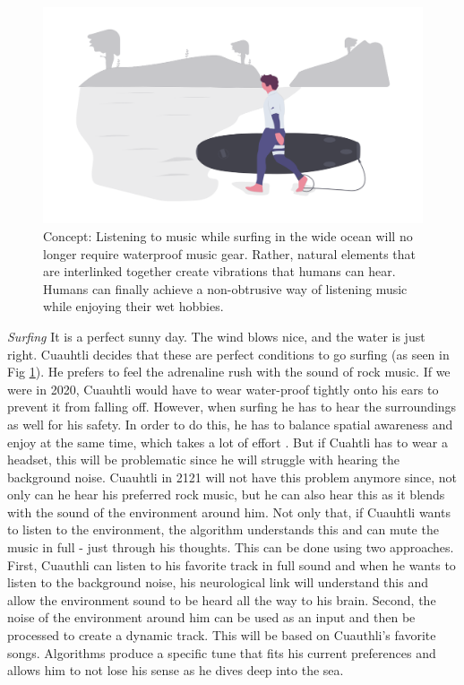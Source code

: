 \documentclass[sigchi]{acmart}
\begin{document}
\begin{figure}[h]
  \centering
  \includegraphics[width=\linewidth]{acmart-master-2/samples/surfbnw.png}
  \caption{Concept: Listening to music while surfing in the wide ocean will no longer require waterproof music gear. Rather, natural elements that are interlinked together create vibrations that humans can hear. Humans can finally achieve a non-obtrusive way of listening music while enjoying their wet hobbies. }
  \label{fig: surf}
\end{figure}

\textit{Surfing}
It is a perfect sunny day. The wind blows nice, and the water is just right. Cuauhtli decides that these are perfect conditions to go surfing (as seen in Fig \ref{fig: surf}). He prefers to feel the adrenaline rush with the sound of rock music. If we were in 2020, Cuauhtli would have to wear water-proof tightly onto his ears to prevent it from falling off. However, when surfing he has to hear the surroundings as well for his safety. %
In order to do this, he has to balance spatial awareness and enjoy at the same time, which takes a lot of effort \cite{fuchs2018dancing}. But if Cuahtli has to wear a headset, this will be problematic since he will struggle with hearing the background noise. Cuauhtli in 2121 will not have this problem anymore since, not only can he hear his preferred rock music, but he can also hear this as it blends with the sound of the environment around him. Not only that, if Cuauhtli wants to listen to the environment, the algorithm understands this and can mute the music in full - just through his thoughts. This can be done using two approaches. First, Cuauthli can listen to his favorite track in full sound and when he wants to listen to the background noise, his neurological link will understand this and allow the environment sound to be heard all the way to his brain. Second, the noise of the environment around him can be used as an input and then be processed to create a dynamic track. This will be based on Cuauthli's favorite songs. Algorithms produce a specific tune that fits his current preferences and allows him to not lose his sense as he dives deep into the sea. 
\end{document}

